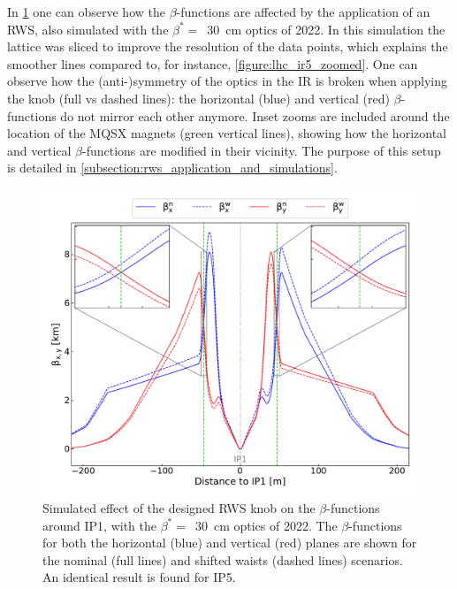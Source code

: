 In \cref{figure:rigid_waist_shift_knob_effect_on_betas} one can observe how the \(\beta\)-functions are affected by the application of an RWS, also simulated with the \(\beta^{\ast} =\)~\qty{30}{\centi\metre} optics of \num{2022}.
In this simulation the lattice was sliced to improve the resolution of the data points, which explains the smoother lines compared to, for instance, \cref{figure:lhc_ir5_zoomed}.
One can observe how the (anti-)symmetry of the optics in the IR is broken when applying the knob (full vs dashed lines): the horizontal (\textcolor{mplb}{blue}) and vertical (\textcolor{mplr}{red}) \(\beta\)-functions do not mirror each other anymore.
Inset zooms are included around the location of the MQSX magnets (\textcolor{mqsx_green}{green} vertical lines), showing how the horizontal and vertical \(\beta\)-functions are modified in their vicinity.
The purpose of this setup is detailed in \cref{subsection:rws_application_and_simulations}.

\begin{figure}[!htb]
    \centering
    \includegraphics[width=\textwidth]{Figures/IR_Coupling_Correction/rigid_waist_shift_betas_effect.pdf}
    \caption{Simulated effect of the designed RWS knob on the \(\beta\)-functions around IP\num{1}, with the \(\beta^{\ast} =\)~\qty{30}{\centi\metre} optics of \num{2022}. The \(\beta\)-functions for both the horizontal (\textcolor{mplb}{blue}) and vertical (\textcolor{mplr}{red}) planes are shown for the nominal (full lines) and shifted waists (dashed lines) scenarios. An identical result is found for IP\num{5}.}
    \label{figure:rigid_waist_shift_knob_effect_on_betas}
\end{figure}

